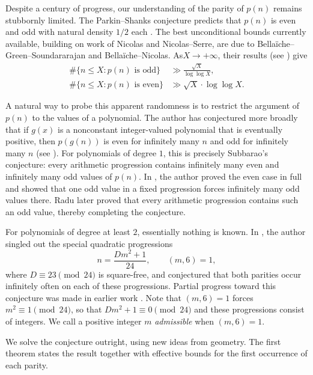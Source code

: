 \documentclass[11pt]{amsart}
\theoremstyle{remark}
\numberwithin{equation}{section}
\begin{document}
Despite a century of progress, our understanding of the parity of $p(n)$
remains stubbornly limited.  The Parkin--Shanks conjecture predicts that
$p(n)$ is even and odd with natural density $1/2$ each
\cite{ParkinShanks1967}.  The best unconditional bounds currently available,
building on work of Nicolas and Nicolas--Serre, are due to
Bella\"iche--Green--Soundararajan and Bella\"iche--Nicolas.   As$X\rightarrow +\infty$, their results (see \cite{BGS2018,BN,Nicolas,NicolasSerre}) give
\begin{displaymath}
\begin{split}
 \#\{n\leq X:p(n)\text{ is odd}\}
 & \gg \frac{\sqrt X}{\log\log X},\\
 \#\{n\leq X:p(n)\text{ is even}\}
 &\gg \sqrt X\cdot \log\log X.
\end{split}
\end{displaymath}

A natural way to probe this apparent randomness is to restrict the argument
of $p(n)$ to the values of a polynomial.  The author has conjectured more
broadly that if
$g(x)$ is a nonconstant integer-valued polynomial that is eventually positive,
then $p(g(n))$ is even for infinitely many $n$ and odd for infinitely many
$n$ (see \cite{Ono2010}).
For polynomials of degree $1$, this is precisely Subbarao's conjecture: every
arithmetic progression contains infinitely many even and infinitely many odd
values of $p(n)$.  In \cite{Ono1996}, the author proved the even case in full
and showed that one odd value in a fixed progression forces infinitely many
odd values there.  Radu \cite{Radu2012} later proved that every arithmetic
progression contains such an odd value, thereby completing the conjecture.

For polynomials of degree at least $2$, essentially nothing is known.  In
\cite{Ono2010}, the author singled out the special quadratic progressions
\[
 n=\frac{Dm^2+1}{24},\qquad (m,6)=1,
\]
where $D\equiv23\pmod{24}$ is square-free, and conjectured that both
parities occur infinitely often on each of these progressions.  Partial
progress toward this conjecture was made in earlier work
\cite{Ono2010,Ono2024}.
Note that $(m,6)=1$ forces
$m^2\equiv1\pmod{24}$, so that $Dm^2+1\equiv0\pmod{24}$ and these progressions
consist of integers.  We call a positive integer $m$ \emph{admissible} when
$(m,6)=1$.  

We solve the conjecture outright, using new ideas from geometry.  The first
theorem states the result together with effective bounds for the first
occurrence of each parity.
\end{document}
